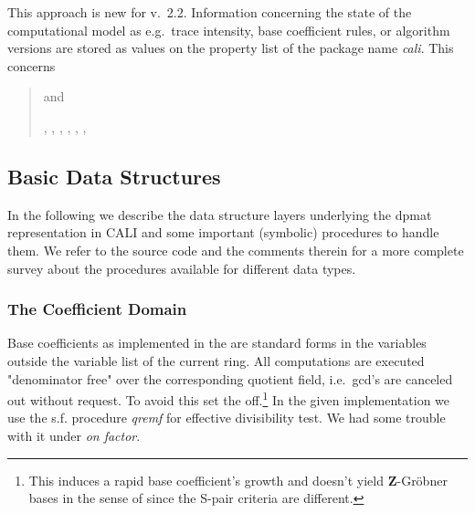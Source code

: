 
This approach is new for v.\ 2.2. Information concerning the state of
the computational model as e.g.\ trace intensity, base coefficient
rules, or algorithm versions are stored as values on the property list
of the package name \emph{cali}. This concerns
\begin{quote}
 and 










, , , ,
, ,  

\end{quote}


\subsection{Basic Data Structures}

In the following we describe the data structure layers underlying the 
dpmat representation in CALI and some important (symbolic) procedures
to handle them. We refer to the source code and the comments therein for
a more complete survey about the procedures available for different
data types.

\subsubsection{The Coefficient Domain}

Base coefficients as implemented in the  are standard
forms in the variables outside the variable list of the current
ring. All computations are executed "denominator free" over the
corresponding quotient field, i.e.\ gcd's are canceled out without 
request. To avoid this set the  off.\footnote{This
induces a rapid base coefficient's growth and doesn't yield \textbf{Z}-Gr\"obner 
bases in the sense of \cite{Gianni:88} since the S-pair criteria are
different.} In the given implementation we use the s.f. procedure {\em
qremf} for effective divisibility test. We had some trouble with it
under \emph{on factor}. 

